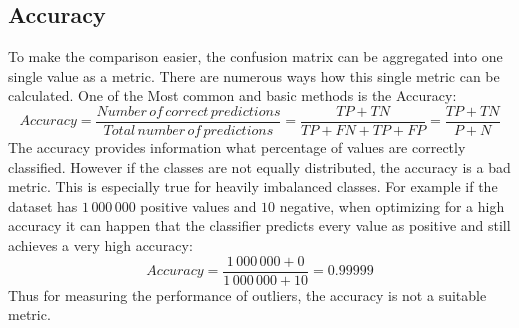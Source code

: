 \subsection{Accuracy}
To make the comparison easier, the confusion matrix can be aggregated into one single value as a metric. There are numerous ways how this single metric can be calculated. One of the Most common and basic methods is the Accuracy:
\begin{equation*}
    Accuracy = \frac{Number\,of\,correct\,predictions}{Total\,number\,of\,predictions} = \frac{TP + TN}{TP + FN + TP + FP} = \frac{TP + TN}{P + N}
\end{equation*}
The accuracy provides information what percentage of values are correctly classified. However if the classes are not equally distributed, the accuracy is a bad metric. This is especially true for heavily imbalanced classes. For example if the dataset has $1\,000\,000$ positive values and $10$ negative, when optimizing for a high accuracy it can happen that the classifier predicts every value as positive and still achieves a very high accuracy:
$$
Accuracy = \frac{1\,000\,000 + 0}{1\,000\,000 + 10} = 0.99999
$$
Thus for measuring the performance of outliers, the accuracy is not a suitable metric.

